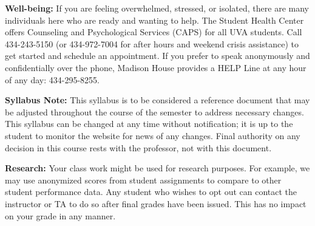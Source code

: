 \documentclass[12pt]{article}
\begin{document}
\textbf{Well-being:} If you are feeling overwhelmed, stressed, or isolated, there are many individuals here who are ready and wanting to help. The Student Health Center offers Counseling and Psychological Services (CAPS) for all UVA students. Call 434-243-5150 (or 434-972-7004 for after hours and weekend crisis assistance) to get started and schedule an appointment. If you prefer to speak anonymously and confidentially over the phone, Madison House provides a HELP Line at any hour of any day: 434-295-8255.

\textbf{Syllabus Note:} This syllabus is to be considered a reference document that may be adjusted throughout the course of the semester to address necessary changes. This syllabus can be changed at any time without notification; it is up to the student to monitor the website for news of any changes. Final authority on any decision in this course rests with the professor, not with this document.

\textbf{Research:}
Your class work might be used for research purposes. For example, we may use anonymized scores from student assignments to compare to other student performance data. Any student who wishes to opt out can contact the instructor or TA to do so after final grades have been issued. This has no impact on your grade in any manner. 
\end{document}
